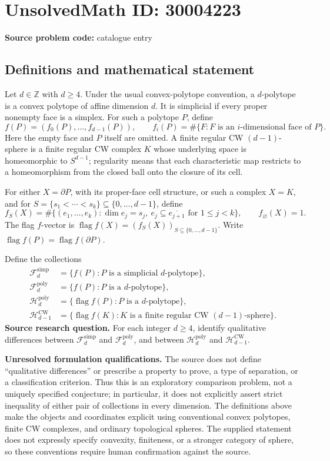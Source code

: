 \documentclass[11pt]{article}
\newcommand{\Z}{\mathbb{Z}}
\begin{document}
\section*{UnsolvedMath ID: 30004223}
\textbf{Source problem code:} catalogue entry
\subsection{Definitions and mathematical statement}
Let \(d\in\Z\) with \(d\geq4\). Under the usual convex-polytope convention, a \(d\)-polytope is a convex polytope of affine dimension \(d\). It is simplicial if every proper nonempty face is a simplex. For such a polytope \(P\), define
\[
f(P)=(f_0(P),\ldots,f_{d-1}(P)),\qquad
f_i(P)=\#\{F:F\text{ is an }i\text{-dimensional face of }P\}.
\]
Here the empty face and \(P\) itself are omitted. A finite regular CW \((d-1)\)-sphere is a finite regular CW complex \(K\) whose underlying space is homeomorphic to \(S^{d-1}\); regularity means that each characteristic map restricts to a homeomorphism from the closed ball onto the closure of its cell.

For either \(X=\partial P\), with its proper-face cell structure, or such a complex \(X=K\), and for \(S=\{s_1<\cdots<s_k\}\subseteq\{0,\ldots,d-1\}\), define
\[
f_S(X)=\#\bigl\{(e_1,\ldots,e_k):\dim e_j=s_j,\ e_j\subseteq\overline{e_{j+1}}\text{ for }1\leq j<k\bigr\},
\qquad f_{\varnothing}(X)=1.
\]
The flag \(f\)-vector is \(\operatorname{flag}f(X)=(f_S(X))_{S\subseteq\{0,\ldots,d-1\}}\). Write \(\operatorname{flag}f(P)=\operatorname{flag}f(\partial P)\).

Define the collections
\[
\begin{aligned}
\mathcal F_d^{\mathrm{simp}}&=\{f(P):P\text{ is a simplicial }d\text{-polytope}\},\\
\mathcal F_d^{\mathrm{poly}}&=\{f(P):P\text{ is a }d\text{-polytope}\},\\
\mathcal H_d^{\mathrm{poly}}&=\{\operatorname{flag}f(P):P\text{ is a }d\text{-polytope}\},\\
\mathcal H_{d-1}^{\mathrm{CW}}&=\{\operatorname{flag}f(K):K\text{ is a finite regular CW }(d-1)\text{-sphere}\}.
\end{aligned}
\]
\textbf{Source research question.} For each integer \(d\geq4\), identify qualitative differences between \(\mathcal F_d^{\mathrm{simp}}\) and \(\mathcal F_d^{\mathrm{poly}}\), and between \(\mathcal H_d^{\mathrm{poly}}\) and \(\mathcal H_{d-1}^{\mathrm{CW}}\).

\textbf{Unresolved formulation qualifications.} The source does not define ``qualitative differences'' or prescribe a property to prove, a type of separation, or a classification criterion. Thus this is an exploratory comparison problem, not a uniquely specified conjecture; in particular, it does not explicitly assert strict inequality of either pair of collections in every dimension. The definitions above make the objects and coordinates explicit using conventional convex polytopes, finite CW complexes, and ordinary topological spheres. The supplied statement does not expressly specify convexity, finiteness, or a stronger category of sphere, so these conventions require human confirmation against the source.
\end{document}

